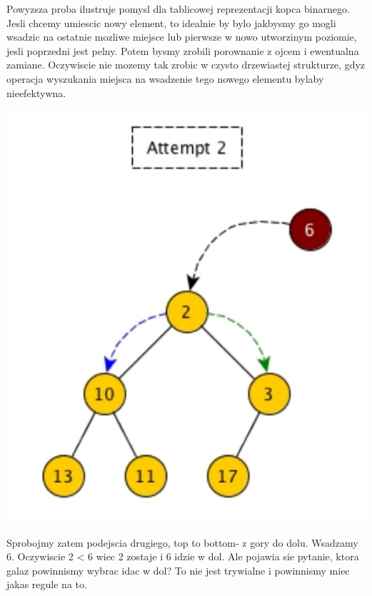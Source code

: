 \documentclass{article}
\begin{document}
Powyzsza proba ilustruje pomysl dla tablicowej reprezentacji kopca binarnego. Jesli chcemy umiescic nowy element, to idealnie by bylo jakbysmy go mogli wsadzic na ostatnie mozliwe miejsce lub pierwsze w nowo utworzinym poziomie, jesli poprzedni jest pelny. Potem bysmy zrobili porownanie z ojcem i ewentualna zamiane. Oczywiscie nie mozemy tak zrobic w czysto drzewiastej strukturze, gdyz operacja wyszukania miejsca na wsadzenie tego nowego elementu bylaby nieefektywna. 


\begin{center}
    \begin{minipage}[h]{0.8\textwidth}
        \centering
        \includegraphics[width=1.0\textwidth]{insert_snd.png}
    \end{minipage}    
\end{center}

Sprobojmy zatem podejscia drugiego, top to bottom- z gory do dolu. Wsadzamy 6. Oczywiscie 2 < 6 wiec 2 zostaje i 6 idzie w dol. Ale pojawia sie pytanie, ktora galaz powinnismy wybrac idac w dol? To nie jest trywialne i powinnismy miec jakas regule na to.
\end{document}
